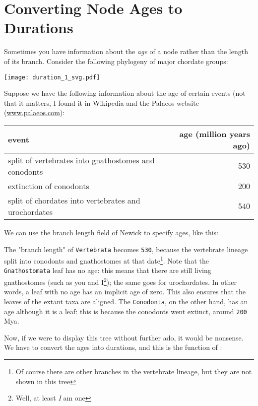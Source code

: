 \section{Converting
Node Ages to Durations}
\label{sct_duration}

Sometimes you have information about the \textit{age} of a node rather than the
length of its branch. Consider the following phylogeny of major chordate groups:

\begin{center}
 \texttt{[image: duration\_1\_svg.pdf]}
\end{center}

Suppose we have the following information about the age of certain events (not
that it matters, I found it in Wikipedia and the Palaeos website
(\url{www.palaeos.com}):

\smallskip
\begin{tabular}{lr}
\textbf{event} & \textbf{age} (million years ago)\\
\hline
split of vertebrates into gnathostomes and conodonts & 530 \\
extinction of conodonts & 200 \\
split of chordates into vertebrates and urochordates & 540 \\
\end{tabular}
\smallskip

\noindent{}We can use the branch length field of Newick to specify ages, like
this:

\begin{samepage}


\end{samepage}

\noindent{}The "branch length" of \texttt{Vertebrata} becomes \texttt{530},
because the vertebrate lineage split into conodonts and gnathostomes at that
date\footnote{Of course there are other branches in the vertebrate lineage, but
they are not shown in this tree}. Note that the \texttt{Gnathostomata} leaf has
no age: this means that there are still living gnathostomes (such as you and
I\footnote{Well, at least \textit{I} am one}); the same goes for urochordates.
In other words, a leaf with no age has an implicit age of zero. This also
ensures that the leaves of the extant taxa are aligned.  The \texttt{Conodonta},
on the other hand, has an age although it is a leaf: this is because the
conodonts went extinct, around \texttt{200} Mya.

Now, if we were to display this tree without further ado, it would be nonsense.
We have to convert the ages into durations, and this is the function of
\duration{}:

